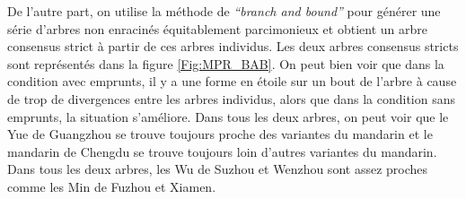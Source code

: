 \documentclass{scrbook}
\newcounter{c}[subsubsection]
\begin{document}
\begin{sloppypar}
De l'autre part, on utilise la méthode de \textit{``branch and bound''} pour générer une série d'arbres non enracinés équitablement parcimonieux et obtient un arbre consensus strict à partir de ces arbres individus. Les deux arbres consensus stricts sont représentés dans la figure \ref{Fig:MPR_BAB}. On peut bien voir que dans la condition avec emprunts, il y a une forme en étoile sur un bout de l'arbre à cause de trop de divergences entre les arbres individus, alors que dans la condition sans emprunts, la situation s'améliore. Dans tous les deux arbres, on peut voir que le Yue de Guangzhou se trouve toujours proche des variantes du mandarin et le mandarin de Chengdu se trouve toujours loin d'autres variantes du mandarin. Dans tous les deux arbres, les Wu de Suzhou et Wenzhou sont assez proches comme les Min de Fuzhou et Xiamen. 


\end{sloppypar}
\end{document}

